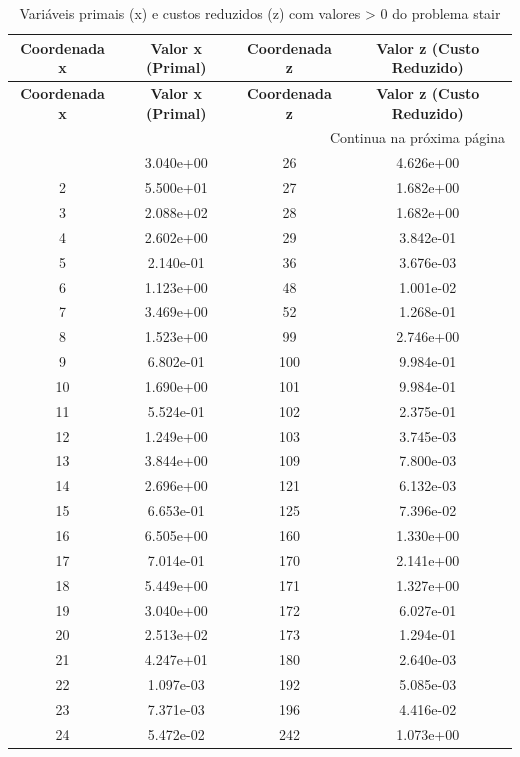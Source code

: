 \documentclass[12pt]{article}
\begin{document}
\begin{longtable}{@{}cccc@{}}
\caption{Variáveis primais (x) e custos reduzidos (z) com valores > 0 do problema stair} \\
\toprule
\textbf{Coordenada x} & \textbf{Valor x (Primal)} & \textbf{Coordenada z} & \textbf{Valor z (Custo Reduzido)} \\
\midrule
\endfirsthead

\toprule
\textbf{Coordenada x} & \textbf{Valor x (Primal)} & \textbf{Coordenada z} & \textbf{Valor z (Custo Reduzido)} \\
\midrule
\endhead

\midrule \multicolumn{4}{r}{{Continua na próxima página}} \\ \midrule
\endfoot

\bottomrule
\endlastfoot
1 & 3.040e+00 & 26 & 4.626e+00 \\
2 & 5.500e+01 & 27 & 1.682e+00 \\
3 & 2.088e+02 & 28 & 1.682e+00 \\
4 & 2.602e+00 & 29 & 3.842e-01 \\
5 & 2.140e-01 & 36 & 3.676e-03 \\
6 & 1.123e+00 & 48 & 1.001e-02 \\
7 & 3.469e+00 & 52 & 1.268e-01 \\
8 & 1.523e+00 & 99 & 2.746e+00 \\
9 & 6.802e-01 & 100 & 9.984e-01 \\
10 & 1.690e+00 & 101 & 9.984e-01 \\
11 & 5.524e-01 & 102 & 2.375e-01 \\
12 & 1.249e+00 & 103 & 3.745e-03 \\
13 & 3.844e+00 & 109 & 7.800e-03 \\
14 & 2.696e+00 & 121 & 6.132e-03 \\
15 & 6.653e-01 & 125 & 7.396e-02 \\
16 & 6.505e+00 & 160 & 1.330e+00 \\
17 & 7.014e-01 & 170 & 2.141e+00 \\
18 & 5.449e+00 & 171 & 1.327e+00 \\
19 & 3.040e+00 & 172 & 6.027e-01 \\
20 & 2.513e+02 & 173 & 1.294e-01 \\
21 & 4.247e+01 & 180 & 2.640e-03 \\
22 & 1.097e-03 & 192 & 5.085e-03 \\
23 & 7.371e-03 & 196 & 4.416e-02 \\
24 & 5.472e-02 & 242 & 1.073e+00 \\

\end{longtable}
\end{document}
